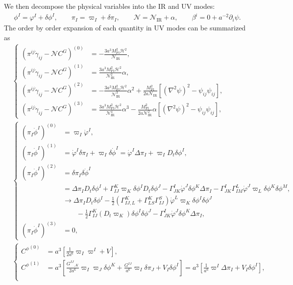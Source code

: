 \documentclass[aps, prd
, preprint
, nofootinbib 
, notitlepage
, longbibliography
]{revtex4-1}
\newcommand{\Mpl}{M_\text{Pl}}
\newcommand{\IR}{\text{IR}}
\newcommand{\dps}{\displaystyle}
\newcommand{\calH}{\mathcal{H}}
\newcommand{\calN}{\mathcal{N}}
\newcommand{\dphi}{\delta\phi}
\newcommand{\dpi}{\delta\pi}
\newcommand{\Dpi}{\Delta\pi}
\newcommand{\bae}[1]{\begin{align} #1 \end{align}}
\newcommand{\bce}[1]{\begin{cases} #1 \end{cases}}
\begin{document}
We then decompose the physical variables into the IR and UV modes:
\bae{
    \phi^I=\varphi^I+\dphi^I, \qquad \pi_I=\varpi_I+\dpi_I, \qquad \calN=\calN_\IR+\alpha, \qquad \beta^i=0+a^{-2}\partial_i\psi.
}
The order by order expansion of each quantity in UV modes can be summarized as
\bae{
	&\bce{
    		\dps
 	   	(\pi^{ij}\dot{\gamma}_{ij}-\calN C^G)^{(0)} &
		\dps
		=-\frac{3a^3\Mpl^2\calH^2}{\calN_\IR}, \\
		\dps
		(\pi^{ij}\dot{\gamma}_{ij}-\calN C^G)^{(1)} &
		\dps
		=\frac{3a^3\Mpl^2\calH^2}{\calN_\IR^2}\alpha, \\
		\dps
		(\pi^{ij}\dot{\gamma}_{ij}-\calN C^G)^{(2)} & 
		\dps
		=-\frac{3a^3\Mpl^2\calH^2}{\calN_\IR^3}\alpha^2+\frac{\Mpl^2}{2a\calN_\IR}[(\nabla^2\psi)^2-\psi_{ij}\psi_{ij}], \\
		\dps
		(\pi^{ij}\dot{\gamma}_{ij}-\calN C^G)^{(3)} & 
		\dps
		=\frac{3a^3\Mpl^2\calH^2}{\calN_\IR^4}\alpha^3-\frac{\Mpl^2}{2a\calN_\IR^2}\alpha[(\nabla^2\psi)^2-\psi_{ij}\psi_{ij}],
	    } \\
    &\bce{
        \dps
        (\pi_I\dot{\phi}^I)^{(0)} & 
        \dps
        =\varpi_I\dot{\varphi}^I, \\
        \dps
        (\pi_I\dot{\phi}^I)^{(1)} &
        \dps
        =\dot{\varphi}^I\dpi_I+\varpi_I\delta\dot{\phi}^I=\dot{\varphi}^I\Dpi_I+\varpi_ID_t\dphi^I, \\
        \dps
        (\pi_I\dot{\phi}^I)^{(2)} &
        \dps
        =\dpi_I\delta\dot{\phi}^I \\
        &\dps
        =\Dpi_ID_t\dphi^I+\Gamma^K_{IJ}\varpi_K\dphi^ID_t\dphi^J-\Gamma^I_{JK}\dot{\varphi}^J\dphi^K\Dpi_I-\Gamma^I_{JK}\Gamma^L_{IM}\dot{\varphi}^J\varpi_L\dphi^K\dphi^M, \\
        &\dps
        \to\Dpi_ID_t\dphi^I-\frac{1}{2}(\Gamma^K_{IJ,L}+\Gamma^K_{LS}\Gamma^S_{IJ})\dot{\varphi}^L\varpi_K\dphi^I\dphi^J \\
        &\dps \qquad
        -\frac{1}{2}\Gamma^K_{IJ}(D_t\varpi_K)\dphi^I\dphi^J-\Gamma^I_{JK}\dot{\varphi}^J\dphi^K\Dpi_I, \\
        \dps
        (\pi_I\dot{\phi}^I)^{(3)} &
        \dps
        =0,
    } \\
    &\bce{
        \dps
        {C^\phi}^{(0)} &
        \dps
        =a^3\left[\frac{1}{2a^6}\varpi_I\varpi^I+V\right], \\
        \dps
        {C^\phi}^{(1)} &
        \dps
        =a^3\left[\frac{G^{IJ}{}_{,K}}{2a^6}\varpi_I\varpi_J\dphi^K+\frac{G^{IJ}}{a^6}\varpi_I\dpi_J+V_I\dphi^I\right]=a^3\left[\frac{1}{a^6}\varpi^I\Dpi_I+V_I\dphi^I\right], \\
}}
\end{document}
